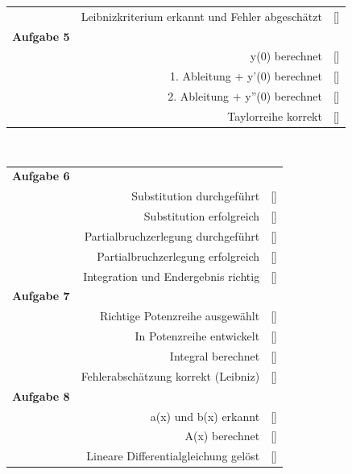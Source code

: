 \documentclass[11pt,final]{scrreprt}
\newcommand{\gbr} {\bigskip\\}
\begin{document}
\begin{tabular}{rrl}
 & Leibnizkriterium erkannt und Fehler abgeschätzt &  [\hspace*{0.3cm}]\gbr 
\textbf{Aufgabe 5 }&  &  \\ 
 & y(0) berechnet & [\hspace*{0.3cm}] \\ 
 & 1. Ableitung + y'(0) berechnet & [\hspace*{0.3cm}] \\ 
 & 2. Ableitung + y''(0) berechnet & [\hspace*{0.3cm}] \\ 
 & Taylorreihe korrekt & [\hspace*{0.3cm}] \gbr 

\end{tabular}\\
\newpage 
\begin{tabular}{rrl}
\textbf{Aufgabe 6} &  &  \\ 
 & Substitution durchgeführt & [\hspace*{0.3cm}] \\ 
 & Substitution erfolgreich & [\hspace*{0.3cm}] \\ 
 & Partialbruchzerlegung durchgeführt & [\hspace*{0.3cm}] \\ 
 & Partialbruchzerlegung erfolgreich & [\hspace*{0.3cm}] \\ 
 & Integration und Endergebnis richtig & [\hspace*{0.3cm}] \\ 
\textbf{Aufgabe 7} & \hspace*{7.5cm} &  \\ 
 & Richtige Potenzreihe ausgewählt & [\hspace*{0.3cm}] \\ 
 & In Potenzreihe entwickelt  & [\hspace*{0.3cm}] \\ 
 & Integral berechnet & [\hspace*{0.3cm}] \\ 
 & Fehlerabschätzung korrekt (Leibniz) & [\hspace*{0.3cm}] \gbr 
\textbf{Aufgabe 8} &  &  \\ 
 & a(x) und b(x) erkannt & [\hspace*{0.3cm}] \\ 
 & A(x) berechnet & [\hspace*{0.3cm}] \\ 
 & Lineare Differentialgleichung gelöst & [\hspace*{0.3cm}] \gbr

\end{tabular}
\end{document}
